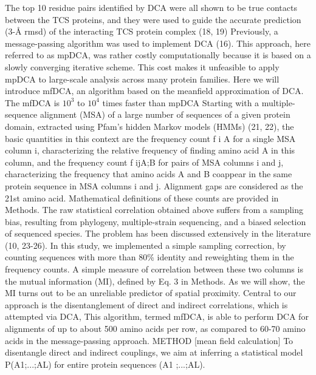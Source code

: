 The top 10 residue pairs identified by DCA were all shown to be true contacts between the TCS proteins, and they were used to guide the accurate prediction (3-Å rmsd) of the interacting TCS protein complex (18, 19) \cite{morcos2011direct}
Previously, a message-passing algorithm was used to implement DCA (16). This approach, here referred to as mpDCA, was rather costly computationally because it is based on a slowly converging iterative scheme. This cost makes it unfeasible to apply mpDCA to large-scale analysis across many protein families. \cite{morcos2011direct}
Here we will introduce mfDCA, an algorithm based on the meanfield approximation of DCA. The mfDCA is $10^3$ to $10^4$ times faster than mpDCA \cite{morcos2011direct}
Starting with a multiple-sequence alignment (MSA) of a large number of sequences of a given protein domain, extracted using Pfam's hidden Markov models (HMMs) (21, 22), the basic quantities in this context are the frequency count f i A for a single MSA column i, characterizing the relative frequency of finding amino acid A in this column, and the frequency count f ijA;B for pairs of MSA columns i and j, characterizing the frequency that amino acids A and B coappear in the same protein sequence in MSA columns i and j. Alignment gaps are considered as the 21st amino acid. Mathematical definitions of these counts are provided in Methods. \cite{morcos2011direct}
The raw statistical correlation obtained above suffers from a sampling bias, resulting from phylogeny, multiple-strain sequencing, and a biased selection of sequenced species. The problem has been discussed extensively in the literature (10, 23-26). \cite{morcos2011direct}
In this study, we implemented a simple sampling correction, by counting sequences with more than 80\% identity and reweighting them in the frequency counts.  \cite{morcos2011direct}
A simple measure of correlation between these two columns is the mutual information (MI), defined by Eq. 3 in Methods. As we will show, the MI turns out to be an unreliable predictor of spatial proximity. \cite{morcos2011direct}
Central to our approach is the disentanglement of direct and indirect correlations, which is attempted via DCA, \cite{morcos2011direct}
This algorithm, termed mfDCA, is able to perform DCA for alignments of up to about 500 amino acids per row, as compared to 60-70 amino acids in the message-passing approach.  \cite{morcos2011direct}
METHOD [mean field calculation] \cite{morcos2011direct}
	To disentangle direct and indirect couplings, we aim at inferring a statistical model P(A1;...;AL) for entire protein sequences (A1 ;...;AL). \cite{morcos2011direct}
